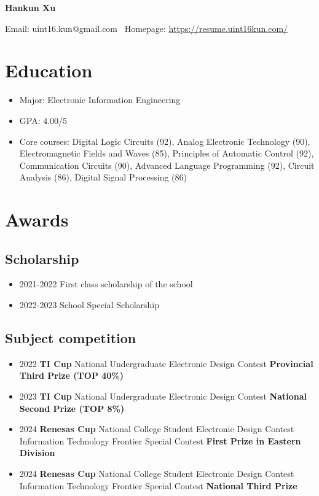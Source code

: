 \documentclass{article}
\begin{document}
\begin{center}
    \textbf{\Large Hankun Xu}
\end{center}

\begin{center}
    Email: uint16.kun@gmail.com \textbar \  Homepage: \href{https://resume.uint16kun.com/}{https://resume.uint16kun.com/}
\end{center}

\section*{Education}
\begin{itemize}
    \item Major: Electronic Information Engineering
    \item GPA: 4.00/5
    \item Core courses: Digital Logic Circuits (92), Analog Electronic Technology (90), Electromagnetic Fields and Waves (85), Principles of Automatic Control (92), Communication Circuits (90), Advanced Language Programming (92), Circuit Analysis (86), Digital Signal Processing (86)
\end{itemize}

\section*{Awards}
\subsection*{Scholarship}
\begin{itemize}
    \item 2021-2022 First class scholarship of the school
    \item 2022-2023 School Special Scholarship
\end{itemize}

\subsection*{Subject competition}
\begin{itemize}
    \item 2022 \textbf{TI Cup} National Undergraduate Electronic Design Contest \textbf{Provincial Third Prize (TOP 40\%)}
    \item 2023 \textbf{TI Cup} National Undergraduate Electronic Design Contest \textbf{National Second Prize (TOP 8\%)}
    \item 2024 \textbf{Renesas Cup} National College Student Electronic Design Contest Information Technology Frontier Special Contest \textbf{First Prize in Eastern Division}
    \item 2024 \textbf{Renesas Cup} National College Student Electronic Design Contest Information Technology Frontier Special Contest \textbf{National Third Prize}
\end{itemize}
\end{document}
